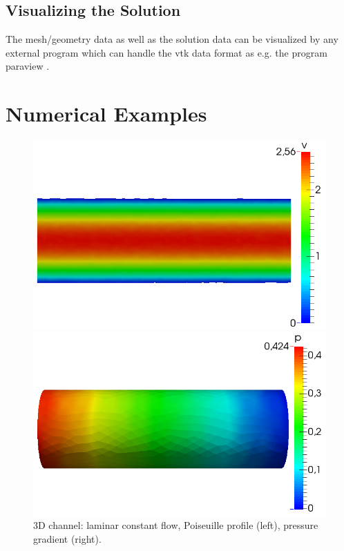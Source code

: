\documentclass[a4paper, 11pt, twoside]{article}
\begin{document}
\subsection{Visualizing the Solution}
The mesh/geometry data as well as the solution data can be visualized 
by any external program which can handle the vtk data format as e.g. the program paraview \cite{Paraview}. 

\section{Numerical Examples}

\begin{figure}[!h]
\centering
\begin{minipage}{0.4\textwidth}
\includegraphics[width=\textwidth]{fig/channel_velocity_step5.png}
\end{minipage}
\hspace{1cm}
\begin{minipage}{0.4\textwidth}
  \includegraphics[width=\textwidth]{fig/channel_pressure_step5.png}
  \end{minipage}
\caption{3D channel: laminar constant flow, Poiseuille profile (left), pressure gradient (right).}
 \label{channel}
\end{figure}
\end{document}
